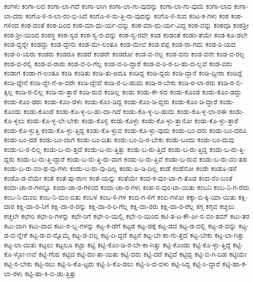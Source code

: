 {ಕಂಗಳು
ಕಂಗಾ-ಲದ
ಕಂಗಾ-ಲಾ-ಗದೆ
ಕಂಗಾ-ಲಾಗಿ
ಕಂಗಾ-ಲಾ-ಗು-ವುದನ್ನು
ಕಂಗಾ-ಲಾ-ಗು-ವುದು
ಕಂಗಾ-ಲಾದ
ಕಂಗಾ-ಲಾ-ದರು
ಕಂಗೊ-ಳಿ-ಸ-ಲಾ-ರಂ-ಭಿ-ಸಿದೆ
ಕಂಗೊ-ಳಿ-ಸು-ತ್ತಿ-ರು-ವುದನ್ನು
ಕಂಗೊ-ಳಿ-ಸುವ
ಕಂಟ-ಕ-ಗಳು
ಕಂಠ
ಕಂಠ-ಗಳಿಂದ
ಕಂಠ-ದಂತೆ
ಕಂಠ-ದಿಂದ
ಕಂಠ-ಮಾ-ಧು-ರ್ಯ-ವನ್ನು
ಕಂಠ-ಮಾ-ಧು-ರ್ಯ-ವಿದ್ದ
ಕಂಠ-ವನ್ನು
ಕಂಠವೂ
ಕಂಠಶ್ರೀ
ಕಂಠ-ಶ್ರೀ-ಯಿಂದ
ಕಂಠಸ್ಥ
ಕಂಠ-ಸ್ವರ
ಕಂಠ-ಸ್ವ-ರ-ವನ್ನು
ಕಂಠ-ಸ್ವ-ರವೇ
ಕಂಡ
ಕಂಡಂತೆ
ಕಂಡಂ-ತೆಯೇ
ಕಂಡ-ಕೂ-ಡಲೇ
ಕಂಡ-ದ್ದನ್ನೇ
ಕಂಡದ್ದು
ಕಂಡ-ದ್ದೇನು
ಕಂಡ-ಮೇ-ಲಂತೂ
ಕಂಡ-ಮೇಲೆ
ಕಂಡ-ರಪ್ಪ
ಕಂಡ-ರಾ-ಗದು
ಕಂಡ-ರಿ-ಯದ
ಕಂಡ-ರಿ-ಯರು
ಕಂಡರು
ಕಂಡರೂ
ಕಂಡರೆ
ಕಂಡರೇ
ಕಂಡರೋ
ಕಂಡ-ವ-ನಲ್ಲ
ಕಂಡ-ವನು
ಕಂಡ-ವನೇ
ಕಂಡ-ವ-ರಲ್ಲ
ಕಂಡ-ವ-ರಲ್ಲಿ
ಕಂಡ-ವ-ರಾರು
ಕಂಡ-ವ-ರಿ-ಗೆಲ್ಲ
ಕಂಡ-ವ-ರಿ-ದ್ದಾರೆ
ಕಂಡ-ವ-ರಿ-ರ-ಬ-ಹು-ದ-ಲ್ಲವೆ
ಕಂಡ-ವರು
ಕಂಡಾಗ
ಕಂಡಾ-ಗ-ಲಂತೂ
ಕಂಡಿ
ಕಂಡಿತು
ಕಂಡಿ-ತು-ಅದೂ
ಕಂಡಿದ್ದ
ಕಂಡಿ-ದ್ದರು
ಕಂಡಿ-ದ್ದಾನೆ
ಕಂಡಿ-ದ್ದೀರಾ
ಕಂಡಿದ್ದೆ
ಕಂಡಿ-ದ್ದೇನೆ
ಕಂಡಿ-ದ್ದೇ-ನೆ-ಅ-ವರೇ
ಕಂಡಿ-ದ್ದೇವೆ
ಕಂಡಿ-ರ-ಬ-ಹುದು
ಕಂಡಿ-ರ-ಬೇಕು
ಕಂಡಿ-ರ-ಲಾ-ರರು
ಕಂಡಿ-ರ-ಲಿ-ಕ್ಕಿಲ್ಲ
ಕಂಡಿ-ರ-ಲಿಲ್ಲ
ಕಂಡಿ-ರು-ತ್ತಾರೆ
ಕಂಡಿ-ರುವ
ಕಂಡಿಲ್ಲ
ಕಂಡು
ಕಂಡು-ಕೇ-ಳಿದ
ಕಂಡು-ಕೊಂಡ
ಕಂಡು-ಕೊಂ-ಡದ್ದು
ಕಂಡು-ಕೊಂ-ಡರು
ಕಂಡು-ಕೊಂ-ಡಳು
ಕಂಡು-ಕೊಂ-ಡಿದ್ದ
ಕಂಡು-ಕೊಂ-ಡಿ-ದ್ದರು
ಕಂಡು-ಕೊಂ-ಡಿ-ದ್ದಾರೆ
ಕಂಡು-ಕೊಂಡು
ಕಂಡು-ಕೊಂಡೆ
ಕಂಡು-ಕೊ-ಳ್ಳ-ಬ-ಹು-ದಾ-ಗಿದೆ
ಕಂಡು-ಕೊ-ಳ್ಳ-ಬ-ಹುದು
ಕಂಡು-ಕೊ-ಳ್ಳ-ಲಾ-ರಈ
ಕಂಡು-ಕೊ-ಳ್ಳಲು
ಕಂಡು-ಕೊ-ಳ್ಳ-ಲೇ-ಬೇಕು
ಕಂಡು-ಕೊಳ್ಳಿ
ಕಂಡು-ಕೊಳ್ಳು
ಕಂಡು-ಕೊ-ಳ್ಳು-ತ್ತಾನೋ
ಕಂಡು-ಕೊ-ಳ್ಳು-ತ್ತಾರೆ
ಕಂಡು-ಕೊ-ಳ್ಳುತ್ತಿ
ಕಂಡು-ಕೊ-ಳ್ಳು-ತ್ತಿದ್ದ
ಕಂಡು-ಕೊ-ಳ್ಳುವ
ಕಂಡು-ಕೊ-ಳ್ಳು-ವುದು
ಕಂಡು-ಬಂ-ದರು
ಕಂಡು-ಬಂ-ದರೂ
ಕಂಡು-ಬಂ-ದರೆ
ಕಂಡು-ಬಂ-ದಾಗ
ಕಂಡು-ಬಂ-ದಿತು
ಕಂಡು-ಬಂ-ದಿ-ರ-ಬೇಕು
ಕಂಡು-ಬಂದು
ಕಂಡು-ಬಂ-ದುವು
ಕಂಡು-ಬ-ರ-ಲಿಲ್ಲ
ಕಂಡು-ಬ-ರು-ತ್ತದೆ
ಕಂಡು-ಬ-ರು-ತ್ತಿತ್ತು
ಕಂಡು-ಬ-ರು-ತ್ತಿದೆ
ಕಂಡು-ಬ-ರು-ತ್ತಿದ್ದ
ಕಂಡು-ಬ-ರು-ತ್ತಿ-ದ್ದರು
ಕಂಡು-ಬ-ರು-ತ್ತಿ-ದ್ದಾರೆ
ಕಂಡು-ಬ-ರು-ತ್ತಿ-ರು-ವಾಗ
ಕಂಡು-ಬ-ರು-ತ್ತಿವೆ
ಕಂಡು-ಬ-ರುವ
ಕಂಡು-ಬ-ರು-ವಂ-ತಹ
ಕಂಡು-ಬ-ರು-ವಂ-ಥ-ವು-ಗಳು
ಕಂಡು-ಬ-ರು-ವು-ದಿಲ್ಲ
ಕಂಡು-ಹಿ-ಡಿ-ದಿಲ್ಲ
ಕಂಡೆ
ಕಂಡೆನೋ
ಕಂಡೇ
ಕಂಡೊ-ಡನೆ
ಕಂಡೊ-ಡ-ನೆಯೇ
ಕಂತೆ
ಕಂತೆ-ಪು-ರಾಣ
ಕಂತೆ-ಯನ್ನು
ಕಂತೆಯೇ
ಕಂದ-ಕ-ವುಂ-ಟಾ-ಗ-ತೊಡ
ಕಂದ-ನೆಂ-ಬಂತೆ
ಕಂದಾ-ಚಾ-ರ-ಗಳನ್ನೂ
ಕಂದಾ-ಚಾ-ರ-ಗಳಿಂದ
ಕಂದಾ-ಚಾ-ರ-ಗಳು
ಕಂಪ-ನ-ವುಂ-ಟಾ-ಯಿತು
ಕಂಬನಿ
ಕಂಬ-ನಿ-ಗ-ರೆದು
ಕಂಬ-ನಿ-ದುಂಬಿ
ಕಂಬ-ನಿ-ದುಂ-ಬಿತು
ಕಂಬಳಿ
ಕಂಬ-ಳಿ-ಗಳ
ಕಂಬಿ-ಗ-ಳಿಗೆ
ಕಂಬಿ-ಗಳೋ
ಕಕ್ಕಾ-ಬಿ-ಕ್ಕಿ-ಯಾ-ಯಿತು
ಕಕ್ಷಿ-ದಾರ
ಕಕ್ಷಿ-ದಾ-ರ-ನಿಗೆ
ಕಕ್ಷಿ-ದಾ-ರ-ರನ್ನು
ಕಕ್ಷಿ-ದಾ-ರ-ರಿ-ಗೆಲ್ಲ
ಕಕ್ಷಿ-ದಾ-ರರು
ಕಕ್ಷಿ-ದಾ-ರ-ರೆಲ್ಲ
ಕಗ್ಗ
ಕಗ್ಗವ
ಕಚ್ಚಲು
ಕಚ್ಚಲೇ
ಕಛೇರಿ
ಕಛೇ-ರಿ-ಗಳನ್ನು
ಕಛೇ-ರಿಗೆ
ಕಛೇ-ರಿ-ಯಲ್ಲಿ
ಕಛೇ-ರಿ-ಯಿಂದ
ಕಟಿ-ತ-ಟ-ಕೌ-ಪೀ-ನ-ವಂ-ತಮ್
ಕಟು-ತರ
ಕಟು-ವಾಗಿ
ಕಟು-ವಾದ
ಕಟು-ಶ-ಬ್ದ-ಗಳನ್ನು
ಕಟ್ಟ-ಕ-ಡೆಗೆ
ಕಟ್ಟಡ
ಕಟ್ಟ-ಡಕ್ಕೆ
ಕಟ್ಟ-ಡದ
ಕಟ್ಟ-ಡ-ದಲ್ಲಿ
ಕಟ್ಟ-ಡ-ವನ್ನು
ಕಟ್ಟ-ಡ-ವ-ನ್ನೇಕೆ
ಕಟ್ಟ-ಡ-ವ-ನ್ನೊಮ್ಮೆ
ಕಟ್ಟ-ಡ-ವಲ್ಲ
ಕಟ್ಟ-ದಿ-ದ್ದರೆ
ಕಟ್ಟನೆ
ಕಟ್ಟ-ಬೇ-ಕಾ-ಗು-ತ್ತದೆ
ಕಟ್ಟ-ಬೇಕು
ಕಟ್ಟ-ಲಾ-ಗಿತ್ತು
ಕಟ್ಟ-ಲಾ-ಯಿತು
ಕಟ್ಟಲು
ಕಟ್ಟಲೂ
ಕಟ್ಟಾ
ಕಟ್ಟಿ
ಕಟ್ಟಿ-ಕೊಂ-ಡಿ-ರ-ಬೇ-ಕಾ-ಗಿತ್ತು
ಕಟ್ಟಿ-ಕೊಂಡು
ಕಟ್ಟಿ-ಕೊ-ಳ್ಳು-ತ್ತಿದ್ದೆ
ಕಟ್ಟಿ-ಕೊ-ಳ್ಳೋ-ಣವೆ
ಕಟ್ಟಿ-ಗೆಯ
ಕಟ್ಟಿದ
ಕಟ್ಟಿ-ದಂ-ತಾ-ಯಿತು
ಕಟ್ಟಿ-ದರು
ಕಟ್ಟಿ-ದರೆ
ಕಟ್ಟಿದೆ
ಕಟ್ಟಿದ್ದ
ಕಟ್ಟಿ-ಬಿ-ಗಿ-ದಿಹ
ಕಟ್ಟಿಯೇ
ಕಟ್ಟಿ-ಸ-ಬೇಕು
ಕಟ್ಟಿ-ಸಲು
ಕಟ್ಟಿ-ಸಿ-ಕೊ-ಟ್ಟರು
ಕಟ್ಟಿ-ಸಿ-ಕೊ-ಡಲು
ಕಟ್ಟಿ-ಸಿ-ದ-ವಳು
ಕಟ್ಟಿ-ಸಿದ್ದ
ಕಟ್ಟಿ-ಸಿ-ದ್ದಾರೆ
ಕಟ್ಟಿ-ಹಾ-ಕ-ಲಾ-ರಳು
ಕಟ್ಟಿ-ಹಾ-ಕಿ-ಬಿ-ಡು-ತ್ತಿತ್ತು
}
